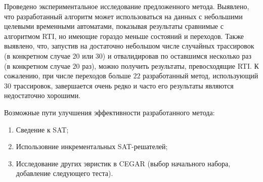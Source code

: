 \documentclass[times,specification,annotation]{itmo-student-thesis}
\begin{document}
\begin{example}
\begin{figure}[!h]
\end{figure}
\end{example}

\chapterconclusion

Проведено экспериментальное исследование предложенного метода. Выявлено, что разработанный алгоритм может использоваться на данных с небольшими
целевыми временными автоматами, показывая результаты сравнимые с алгоритмом RTI, но имеющие гораздо меньше состояний и переходов. 
Также выявлено, что, запустив на достаточно небольшом числе случайных трассировок (в конкретном случае $20$ или $30$)
и отвалидировав по оставшимся несколько раз (в конкретном случае $20$ раз), можно получить результаты, превосходящие RTI.
К сожалению, при числе переходов больше $22$ разработанный метод, использующий $30$ трассировок, завершается очень редко
и часто его результаты являются недостаточно хорошими.

Возможные пути улучшения эффективности разработанного метода: 
\begin{enumerate}
  \item Сведение к SAT;
  \item Использовние инкрементальных SAT-решателей;
  \item Исследование других эвристик в CEGAR (выбор начального набора, добавление следующего теста).
\end{enumerate}

\startconclusionpage
\end{document}
